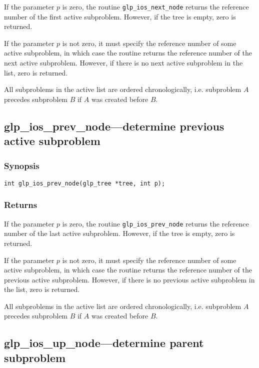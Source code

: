 If the parameter $p$ is zero, the routine \verb|glp_ios_next_node|
returns the reference number of the first active subproblem. However,
if the tree is empty, zero is returned.

If the parameter $p$ is not zero, it must specify the reference number
of some active subproblem, in which case the routine returns the
reference number of the next active subproblem. However, if there is
no next active subproblem in the list, zero is returned.

All subproblems in the active list are ordered chronologically, i.e.
subproblem $A$ precedes subproblem $B$ if $A$ was created before $B$.

\subsection{glp\_ios\_prev\_node---determine previous active
subproblem}

\subsubsection*{Synopsis}

\begin{verbatim}
int glp_ios_prev_node(glp_tree *tree, int p);
\end{verbatim}

\subsubsection*{Returns}

If the parameter $p$ is zero, the routine \verb|glp_ios_prev_node|
returns the reference number of the last active subproblem. However, if
the tree is empty, zero is returned.

If the parameter $p$ is not zero, it must specify the reference number
of some active subproblem, in which case the routine returns the
reference number of the previous active subproblem. However, if there
is no previous active subproblem in the list, zero is returned.

All subproblems in the active list are ordered chronologically, i.e.
subproblem $A$ precedes subproblem $B$ if $A$ was created before $B$.

\newpage

\subsection{glp\_ios\_up\_node---determine parent subproblem}

